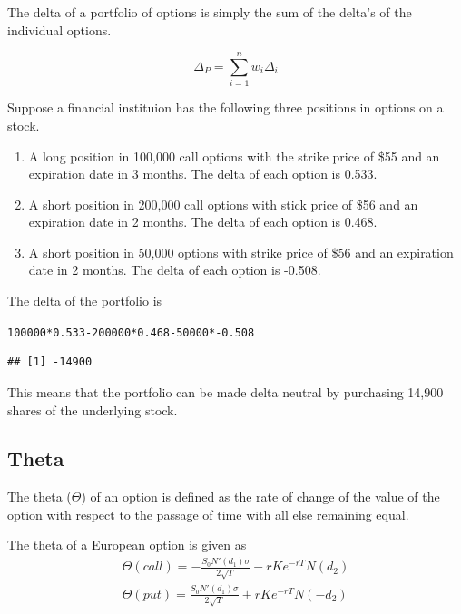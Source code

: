 \documentclass{article}\usepackage[]{graphicx}\usepackage[]{color}
\makeatletter
\newenvironment{kframe}{%
 \def\at@end@of@kframe{}%
 \ifinner\ifhmode%
  \def\at@end@of@kframe{\end{minipage}}%
  \begin{minipage}{\columnwidth}%
 \fi\fi%
 \def\FrameCommand##1{\hskip\@totalleftmargin \hskip-\fboxsep
 \colorbox{shadecolor}{##1}\hskip-\fboxsep
     \hskip-\linewidth \hskip-\@totalleftmargin \hskip\columnwidth}%
 \MakeFramed {\advance\hsize-\width
   \@totalleftmargin\z@ \linewidth\hsize
   \@setminipage}}%
 {\par\unskip\endMakeFramed%
 \at@end@of@kframe}
\newenvironment{knitrout}{}{} %
\makeatother
\begin{document}
The delta of a portfolio of options is simply the sum of the delta's of the individual options.

\begin{equation*}
\Delta_P = \sum_{i=1}^n w_i \Delta_i
\end{equation*}

Suppose a financial instituion has the following three positions in options on a stock.
\begin{enumerate}
  \item A long position in 100,000 call options with the strike price of \$55 and an expiration date in 3 months. The delta of each option is 0.533.
  \item A short position in 200,000 call options with stick price of \$56 and an expiration date in 2 months. The delta of each option is 0.468.
  \item A short position in 50,000 options with strike price of \$56 and an expiration date in 2 months. The delta of each option is -0.508.
\end{enumerate}

The delta of the portfolio is
\begin{knitrout}
\color{fgcolor}\begin{kframe}
\begin{alltt}
100000 * 0.533 - 200000 * 0.468 - 50000 * -0.508
\end{alltt}
\begin{verbatim}
## [1] -14900
\end{verbatim}
\end{kframe}
\end{knitrout}


This means that the portfolio can be made delta neutral by purchasing 14,900 shares of the underlying stock.


\subsection{Theta}
The theta ($\Theta$) of an option is defined as the rate of change of the value of the option with respect to the passage of time with all else remaining equal.

The theta of a European option is given as
\begin{eqnarray*}
\Theta (call) = - \frac{S_0 N'(d_1) \sigma}{2 \sqrt{T}} - r K e^{-r T} N(d_2)\\
\Theta (put) = \frac{S_0 N'(d_1) \sigma}{2 \sqrt{T}} + r K e^{-r T} N(-d_2)\\
\end{eqnarray*}
\end{document}
